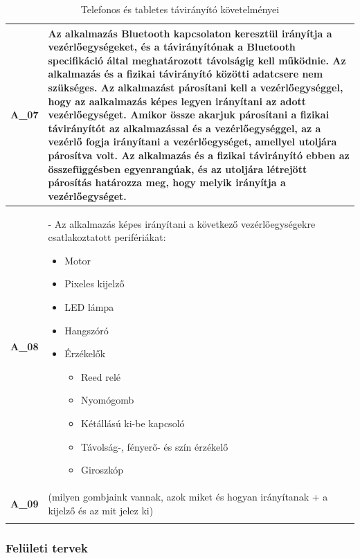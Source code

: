 \documentclass{article}
\begin{document}
\begin{longtable}{|c|p{14cm}|}
       \textbf{A\_07}  & Az alkalmazás Bluetooth kapcsolaton keresztül irányítja a vezérlőegységeket, és a távirányítónak a Bluetooth specifikáció által meghatározott távolságig kell működnie. Az alkalmazás és a fizikai távirányító közötti adatcsere nem szükséges. Az alkalmazást párosítani kell a vezérlőegységgel, hogy az aalkalmazás képes legyen irányítani az adott vezérlőegységet. Amikor össze akarjuk párosítani a fizikai távirányítót az alkalmazással és a vezérlőegységgel, az a vezérlő fogja irányítani a vezérlőegységet, amellyel utoljára párosítva volt. Az alkalmazás és a fizikai távirányító ebben az összefüggésben egyenrangúak, és az utoljára létrejött párosítás határozza meg, hogy melyik irányítja a vezérlőegységet. \\\hline
       
       \textbf{A\_08}  & - Az alkalmazás képes irányítani a következő vezérlőegységekre csatlakoztatott perifériákat:
       \begin{itemize}
       \item Motor
       \item Pixeles kijelző
       \item LED lámpa
       \item Hangszóró
       \item Érzékelők
         \begin{itemize}
         \item Reed relé
         \item Nyomógomb
         \item Kétállású ki-be kapcsoló
         \item Távolság-, fényerő- és szín érzékelő
         \item Giroszkóp
         \end{itemize}
       \end{itemize} \\\hline

       \textbf{A\_09}  & (milyen gombjaink vannak, azok miket és hogyan irányítanak + a kijelző és az mit jelez ki) \\\hline
       
\hline
\caption{Telefonos és tabletes távirányító követelményei}
\end{longtable}
\endgroup

\subsubsection{Felületi tervek}
\end{document}
